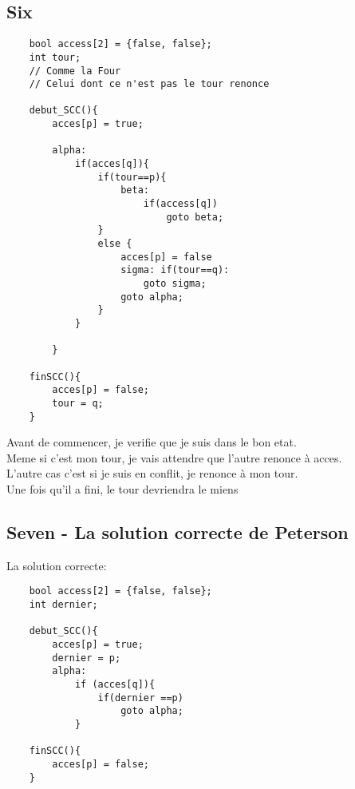 \documentclass[11pt]{article}
\begin{document}
\pagebreak

\subsection{Six}

\begin{verbatim}
	bool access[2] = {false, false};
	int tour;
	// Comme la Four
	// Celui dont ce n'est pas le tour renonce

	debut_SCC(){
		acces[p] = true;
		
		alpha:
			if(acces[q]){
				if(tour==p){
					beta:
						if(access[q])
							goto beta;
				}
				else {
					acces[p] = false
					sigma: if(tour==q):
						goto sigma;
					goto alpha;
				}
			}

		}

	finSCC(){
		acces[p] = false;
		tour = q;
	}
\end{verbatim}
Avant de commencer, je verifie que je suis dans le bon etat.\\
Meme si c'est mon tour, je vais attendre que l'autre renonce à acces.\\
L'autre cas c'est si je suis en conflit, je renonce à mon tour.\\
Une fois qu'il a fini, le tour devriendra le miens

\pagebreak

\subsection{Seven - La solution correcte de Peterson}
La solution correcte:
\begin{verbatim}
	bool access[2] = {false, false};
	int dernier;

	debut_SCC(){
		acces[p] = true;
		dernier = p;
		alpha:
			if (acces[q]){
				if(dernier ==p)
					goto alpha;
			}

	finSCC(){
		acces[p] = false;
	}

\end{verbatim}
\end{document}
